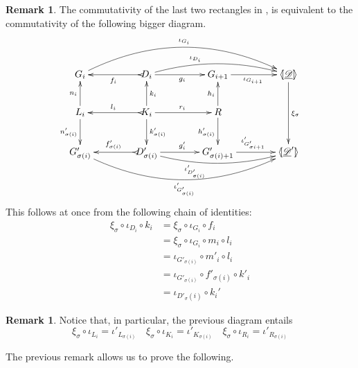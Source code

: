 \documentclass[a4paper]{article}
\newcommand{\dder}[1]{\mathscr{#1}}
\newcommand{\der}[1]{\underline{\dder{#1}}}
\newcommand{\lpro}{\langle \hspace{-1.85pt}[}
\newcommand{\rpro}{]\hspace{-1.85pt}\rangle}
\newcommand{\tpro}[1]{\lpro \der{#1}\rpro}
\theoremstyle{definition}
\newtheorem{remark}[theorem]{Remark}
\begin{document}
\begin{remark}
The commutativity of the last two rectangles in , is equivalent to the commutativity of the following bigger diagram.		
\[\xymatrix@C=40pt{G_i\ar@/^1cm/[rrr]^{\iota_{G_{i}}}&D_i\ar@/^.4cm/[rr]^(.35){\iota_{D_i}} \ar[r]_{g_i} \ar@{>->}[l]^{f_i}&G_{i+1} \ar[r]_{\iota_{G_{i+1}}}&\tpro{D} \ar[dd]^{\xi_\sigma}\\  L_i \ar[u]^{n_i} \ar[d]_{n'_{\sigma(i)}}& K_i \ar[d]^{k'_{\sigma(i)}} \ar[u]_{k_i} \ar[r]^{r_i} \ar@{>->}[l]_{l_i} &R\ar[u]^{h_i} \ar[d]_{h'_{\sigma(i)}}\\G'_{\sigma(i)}\ar@/_1cm/[rrr]_{\iota'_{G'_{\sigma(i)}}} &D'_{\sigma(i)}\ar@{>->}[l]_{f'_{\sigma(i)}} \ar[r]^{g'_i} \ar@/_.4cm/[rr]_(.35){\iota'_{D'_{\sigma(i)}}}&G'_{\sigma(i)+1} \ar[r]^{\iota'_{G'_{\sigma{i}+1}}}& \lpro\der{D}' \rpro }\]
This follows at once from the following chain of identities:
\begin{align*}
	\xi_\sigma \circ \iota_{D_i}\circ k_i&=\xi_\sigma \circ \iota_{G_{i}} \circ f_i\\&= \xi_\sigma \circ \iota_{G_{i}}\circ m_i \circ l_i\\&=\iota_{G'_{\sigma(i)}}\circ m'_i\circ l_i\\&=\iota_{G'_{\sigma(i)}}\circ f'_{\sigma(i)}\circ k'_i\\&=\iota_{D'_\sigma(i)}\circ k_i'
\end{align*}
\end{remark}

\begin{remark}\label{rem:coproj}
Notice that, in particular, the previous diagram entails
		\[\xi_\sigma \circ \iota_{L_i}=\iota'_{L_{\sigma(i)}} \quad \xi_\sigma \circ \iota_{K_i}=\iota'_{K_{\sigma(i)}} \quad \xi_\sigma \circ \iota_{R_i}=\iota'_{R_{\sigma(i)}} \]
\end{remark}

The previous remark allows us to prove the following.
\end{document}
